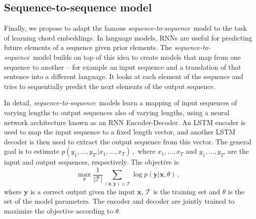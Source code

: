 \documentclass{article}
\newcommand{\T}{\mathcal{T}}
\newcommand{\seqtoseq}{\textit{sequence-to-sequence}}
\begin{document}
\subsection{Sequence-to-sequence model}
%
Finally, we propose to adapt the famous \seqtoseq\ model \citep{SutskeverVL14} to the task of learning chord embeddings. In language models, RNNs are useful for predicting future elements of a sequence given prior elements. The \seqtoseq\ model builds on top of this idea to create models that map from one sequence to another -- for example an input sequence and a translation of that sentence into a different language. It looks at each element of the sequence and tries to sequentially predict the next elements of the output sequence. 

In detail, \seqtoseq\ models learn a mapping of input sequences of varying lengths to output sequences also of varying lengths, using a neural network architecture known as an RNN Encoder-Decoder. 
An LSTM encoder is used to map the input sequence to a fixed length vector, and another LSTM decoder is then used to extract the output sequence from this vector. The general goal is to estimate 
$
p(y_1,\ldots,y_{T'} | x_1, \ldots, x_T)\,,
$
where $x_1, \ldots, x_T$ and  $y_1,\ldots,y_{T'}$
are the input and output sequences, respectively. %
%
The objective is
%
\begin{equation}
\max_{\theta} \frac{1}{|\T|} \sum_{(\boldsymbol{x},\boldsymbol{y}) \in \T} \log p(\boldsymbol{y}|\boldsymbol{x},\theta) \,,
\label{eq:seq2seq_obj}
\end{equation}
%
where $\boldsymbol{y}$ is a correct output given the input $\boldsymbol{x}$, $\T$ is the training set and $\theta$ is the set of the model parameters. 
The encoder and decoder are jointly trained to maximize the objective according to $\theta$.
\end{document}
